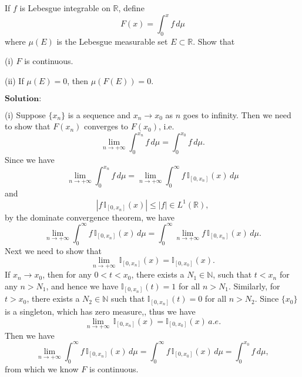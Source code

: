 \documentclass[12pt]{article}
\begin{document}
If $f$ is Lebesgue integrable on $\mathbb{R}$, define
\begin{equation*}
    F(x) = \int_{0}^{x} f \, d \mu
\end{equation*}
where $\mu(E)$ is the Lebesgue measurable set $E \subset \mathbb{R}$. Show that

(i) $F$ is continuous.

(ii) If $\mu(E) = 0$, then $\mu(F(E)) = 0$. 
 

\vspace{8pt}
$\textbf{Solution:}$

(i) Suppose $\{x_{n}\}$ is a sequence and $x_{n} \to x_{0}$ as $n$ goes to infinity. Then we need to show that $F(x_{n})$ converges to $F(x_{0})$, i.e.
\begin{equation*}
    \lim_{n \to + \infty} \int_{0}^{x_{n}} f \, d \mu = \int_{0}^{x_{0}} f \, d \mu.
\end{equation*}
Since we have
\begin{equation*}
    \lim_{n \to + \infty} \int_{0}^{x_{n}} f \, d \mu = \lim_{n \to + \infty} \int_{0}^{\infty} f \, \mathbb{I}_{[0, x_{n}]} (x) \, d \mu
\end{equation*}
and
\begin{equation*}
    |f \, \mathbb{I}_{[0, x_{n}]} (x) | \leq |f| \in L^{1}(\mathbb{R}),
\end{equation*}
by the dominate convergence theorem, we have
\begin{equation*}
     \lim_{n \to + \infty} \int_{0}^{\infty} f \, \mathbb{I}_{[0, x_{n}]} (x) \, d \mu =  \int_{0}^{\infty}  \lim_{n \to + \infty} f \, \mathbb{I}_{[0, x_{n}]} (x) \, d \mu.
\end{equation*}
Next we need to show that
\begin{equation*}
    \lim_{n \to + \infty} \, \mathbb{I}_{[0, x_{n}]} (x) = \mathbb{I}_{[0, x_{0}]} (x).
\end{equation*}
If $x_{n} \to x_{0}$, then for any $0 < t < x_{0}$, there exists a $N_{1} \in \mathbb{N}$, such that $t < x_{n}$ for any $n > N_{1}$, and hence we have $\mathbb{I}_{[0, x_{n}]} (t) = 1$ for all $n > N_{1}$. Similarly, for $t > x_{0}$, there exists a $N_{2} \in \mathbb{N}$ such that $\mathbb{I}_{[0, x_{n}]} (t) = 0$ for all $n > N_{2}$. Since $\{x_{0}\}$ is a singleton, which has zero measure,, thus we have 
\begin{equation*}
    \lim_{n \to + \infty} \, \mathbb{I}_{[0, x_{n}]} (x) = \mathbb{I}_{[0, x_{0}]} (x) \, a.e.
\end{equation*}
Then we have
\begin{equation*}
     \lim_{n \to + \infty} \int_{0}^{\infty} f \, \mathbb{I}_{[0, x_{n}]} (x) \, d \mu =  \int_{0}^{\infty} f \, \mathbb{I}_{[0, x_{0}]} (x) \, d \mu = \int_{0}^{x_{0}} f \, d \mu,
\end{equation*}
from which we know $F$ is continuous.
\end{document}
